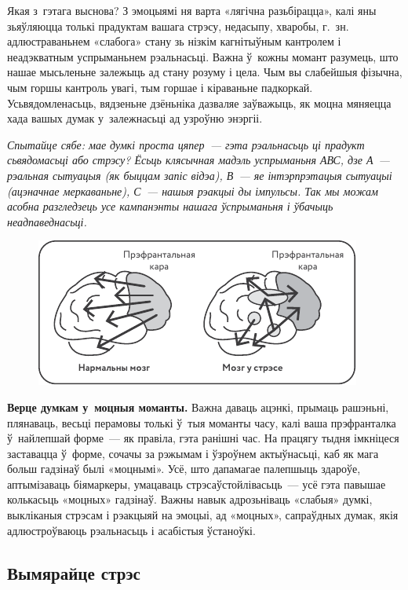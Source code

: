 Якая з~гэтага выснова? З эмоцыямі ня варта «лягічна разьбірацца», калі яны зьяўляюцца толькі прадуктам вашага стрэсу, недасыпу, хваробы, г.~зн. адлюстраваньнем «слабога» стану зь нізкім кагнітыўным кантролем і неадэкватным успрыманьнем рэальнасьці. Важна ў~кожны момант разумець, што нашае мысьленьне залежыць ад стану розуму і цела. Чым вы слабейшыя фізычна, чым горшы кантроль увагі, тым горшае і кіраваньне падкоркай. Усьвядомленасьць, вядзеньне дзёньніка дазваляе заўважыць, як моцна мяняецца хада вашых думак у~залежнасьці ад узроўню энэргіі.

\emph{Спытайце сябе: мае думкі проста цяпер~--- гэта рэальнасьць ці прадукт сьвядомасьці або стрэсу? Ёсьць клясычная мадэль успрыманьня АВС, дзе А~--- рэальная сытуацыя (як быццам запіс відэа), В~--- яе інтэрпрэтацыя сытуацыі (ацэначнае меркаваньне), С~--- нашыя рэакцыі ды імпульсы. Так мы можам асобна разгледзець усе кампанэнты нашага ўспрыманьня і ўбачыць неадпаведнасьці.}

\begin{figure}[htb!]
  \centering
  \includegraphics[scale=1.15]{willpower/ch7/3.pdf}
\end{figure}

\textbf{Верце думкам у~моцныя моманты.} Важна даваць ацэнкі, прымаць рашэньні, плянаваць, весьці перамовы толькі ў~тыя моманты часу, калі ваша прэфранталка ў~найлепшай форме~--- як правіла, гэта ранішні час. На працягу тыдня імкніцеся заставацца ў~форме, сочачы за рэжымам і ўзроўнем актыўнасьці, каб як мага больш гадзінаў былі «моцнымі». Усё, што дапамагае палепшыць здароўе, аптымізаваць біямаркеры, умацаваць стрэсаўстойлівасьць~--- усё гэта павышае колькасьць «моцных» гадзінаў. Важны навык адрозьніваць «слабыя» думкі, выкліканыя стрэсам і рэакцыяй на эмоцыі, ад «моцных», сапраўдных думак, якія адлюстроўваюць рэальнасьць і асабістыя ўстаноўкі.

\subsection*{Вымярайце стрэс}

